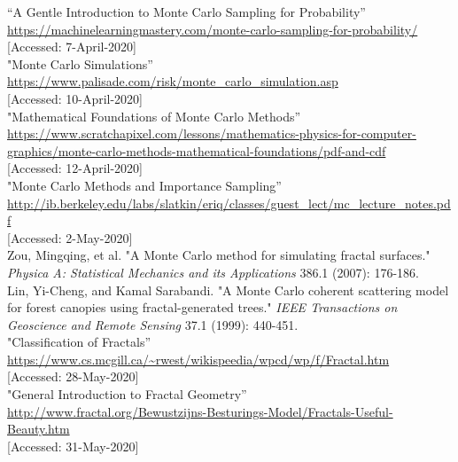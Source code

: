 \documentclass{resonance}
\begin{document}
\begin{thebibliography}{99}

“A Gentle Introduction to Monte Carlo Sampling for Probability”\\ \textcolor{blue}{\url{https://machinelearningmastery.com/monte-carlo-sampling-for-probability/}}\\
{[Accessed: 7-April-2020]}\\

"Monte Carlo Simulations”\\ \textcolor{blue}{\url{https://www.palisade.com/risk/monte_carlo_simulation.asp}}\\
{[Accessed: 10-April-2020]}\\

"Mathematical Foundations of Monte Carlo Methods”\\ \textcolor{blue}{\url{https://www.scratchapixel.com/lessons/mathematics-physics-for-computer-graphics/monte-carlo-methods-mathematical-foundations/pdf-and-cdf}}\\
{[Accessed: 12-April-2020]}\\

"Monte Carlo Methods and Importance Sampling”\\ \textcolor{blue}{\url{http://ib.berkeley.edu/labs/slatkin/eriq/classes/guest\_lect/mc\_lecture\_notes.pdf }}\\
{[Accessed: 2-May-2020]}\\

Zou, Mingqing, et al. "A Monte Carlo method for simulating fractal surfaces." \textit{Physica A: Statistical Mechanics and its Applications} 386.1 (2007): 176-186.\\

Lin, Yi-Cheng, and Kamal Sarabandi. "A Monte Carlo coherent scattering model for forest canopies using fractal-generated trees." \textit{IEEE Transactions on Geoscience and Remote Sensing} 37.1 (1999): 440-451.\\

"Classification of Fractals”\\ \textcolor{blue}{\url{https://www.cs.mcgill.ca/~rwest/wikispeedia/wpcd/wp/f/Fractal.htm}}\\
{[Accessed: 28-May-2020]}\\

"General Introduction to Fractal Geometry”\\ \textcolor{blue}{\url{http://www.fractal.org/Bewustzijns-Besturings-Model/Fractals-Useful-Beauty.htm}}\\
{[Accessed: 31-May-2020]}\\


\end{thebibliography}
\end{document}
